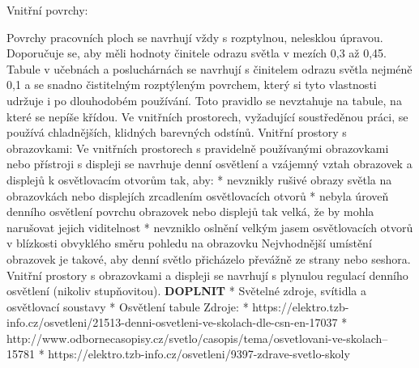 {\sbf Vnitřní povrchy:}

Povrchy pracovních ploch se navrhují vždy s rozptylnou, nelesklou úpravou. Doporučuje se, aby měli hodnoty činitele odrazu světla v mezích 0,3 až 0,45.
\medskip
Tabule v učebnách a posluchárnách se navrhují s činitelem odrazu světla nejméně 0,1 a se snadno čistitelným rozptýleným povrchem, který si tyto vlastnosti udržuje i po dlouhodobém používání. Toto pravidlo se nevztahuje na tabule, na které se nepíše křídou.
\medskip
Ve vnitřních prostorech, vyžadující soustředěnou práci, se používá chladnějších, klidných barevných odstínů.
\medskip
Vnitřní prostory s obrazovkami:
\medskip
Ve vnitřních prostorech s pravidelně používanými obrazovkami nebo přístroji s displeji se navrhuje denní osvětlení a vzájemný vztah obrazovek a displejů k osvětlovacím otvorům tak, aby:
\medskip
\begitems
    * nevznikly rušivé obrazy světla na obrazovkách nebo displejích zrcadlením osvětlovacích otvorů
    * nebyla úroveň denního osvětlení povrchu obrazovek nebo displejů tak velká, že by mohla narušovat jejich viditelnost
    * nevzniklo oslnění velkým jasem osvětlovacích otvorů v blízkosti obvyklého směru pohledu na obrazovku
\enditems
\medskip
Nejvhodnější umístění obrazovek je takové, aby denní světlo přicházelo převážně ze strany nebo seshora.
\medskip
Vnitřní prostory s obrazovkami a displeji se navrhují s plynulou regulací denního osvětlení (nikoliv stupňovitou).
\medskip
{\bf DOPLNIT}
\begitems
* Světelné zdroje, svítidla a osvětlovací soustavy
* Osvětlení tabule
\enditems
\medskip
{\sbf Zdroje:}
\begitems
* https://elektro.tzb-info.cz/osvetleni/21513-denni-osvetleni-ve-skolach-dle-csn-en-17037
* http://www.odbornecasopisy.cz/svetlo/casopis/tema/osvetlovani-ve-skolach--15781
* https://elektro.tzb-info.cz/osvetleni/9397-zdrave-svetlo-skoly
\enditems





